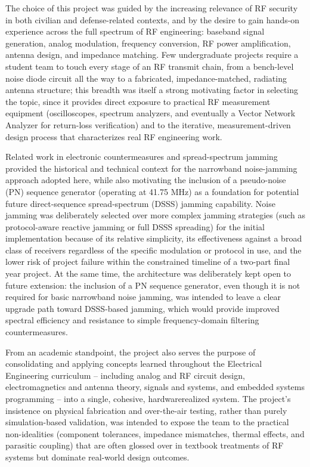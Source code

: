 \documentclass[12pt,a4paper]{report}
\begin{document}
	\vspace{0.5cm}
	
	The choice of this project was guided by the increasing relevance of RF security in both civilian and defense-related contexts, and by the desire to gain hands-on experience across the full spectrum of RF engineering: baseband signal generation, analog modulation, frequency conversion, RF power amplification, antenna design, and impedance matching. Few undergraduate projects require a student team to touch every stage of an RF transmit chain, from a bench-level noise diode circuit all the way to a fabricated, impedance-matched, radiating antenna structure; this breadth was itself a strong motivating factor in selecting the topic, since it provides direct exposure to practical RF measurement equipment (oscilloscopes, spectrum analyzers, and eventually a Vector Network Analyzer for return-loss verification) and to the iterative, measurement-driven design process that characterizes real RF engineering work.
	
	\vspace{0.5cm}
	
	Related work in electronic countermeasures and spread-spectrum jamming provided the historical and technical context for the narrowband noise-jamming approach adopted here, while also motivating the inclusion of a pseudo-noise (PN) sequence generator (operating at 41.75 MHz) as a foundation for potential future direct-sequence spread-spectrum (DSSS) jamming capability. Noise jamming was deliberately selected over more complex jamming strategies (such as protocol-aware reactive jamming or full DSSS spreading) for the initial implementation because of its relative simplicity, its effectiveness against a broad class of receivers regardless of the specific modulation or protocol in use, and the lower risk of project failure within the constrained timeline of a two-part final year project. At the same time, the architecture was deliberately kept open to future extension: the inclusion of a PN sequence generator, even though it is not required for basic narrowband noise jamming, was intended to leave a clear upgrade path toward DSSS-based jamming, which would provide improved spectral efficiency and resistance to simple frequency-domain filtering countermeasures.
	
	\vspace{0.5cm}
	
	From an academic standpoint, the project also serves the purpose of consolidating and applying concepts learned throughout the Electrical Engineering curriculum – including analog and RF circuit design, electromagnetics and antenna theory, signals and systems, and embedded systems programming – into a single, cohesive, hardwarerealized system. The project’s insistence on physical fabrication and over-the-air testing, rather than purely simulation-based validation, was intended to expose the team to the practical non-idealities (component tolerances, impedance mismatches, thermal effects, and parasitic coupling) that are often glossed over in textbook treatments of RF systems but dominate real-world design outcomes.
	
\end{document}
